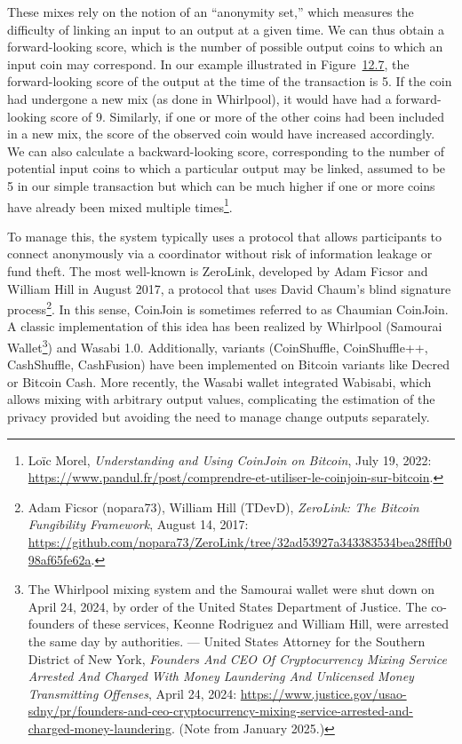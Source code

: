 \documentclass[
  a5paper,
  smalldemyvopaper,10pt,twoside,onecolumn,openright,extrafontsizes,hidelinks]{memoir}
\begin{document}
These mixes rely on the notion of an ``anonymity set,'' which measures
the difficulty of linking an input to an output at a given time. We can
thus obtain a forward-looking score, which is the number of possible
output coins to which an input coin may correspond. In our example
illustrated in Figure~\hyperref[fig:coinjoin-transaction]{12.7}, the
forward-looking score of the output at the time of the transaction is 5.
If the coin had undergone a new mix (as done in Whirlpool), it would
have had a forward-looking score of 9. Similarly, if one or more of the
other coins had been included in a new mix, the score of the observed
coin would have increased accordingly. We can also calculate a
backward-looking score, corresponding to the number of potential input
coins to which a particular output may be linked, assumed to be 5 in our
simple transaction but which can be much higher if one or more coins
have already been mixed multiple times\footnote{Loïc Morel,
  \emph{Understanding and Using CoinJoin on Bitcoin}, July 19, 2022:
  \url{https://www.pandul.fr/post/comprendre-et-utiliser-le-coinjoin-sur-bitcoin}.}.

To manage this, the system typically uses a protocol that allows
participants to connect anonymously via a coordinator without risk of
information leakage or fund theft. The most well-known is ZeroLink,
developed by Adam Ficsor and William Hill in August 2017, a protocol
that uses David Chaum's blind signature process\footnote{Adam Ficsor
  (nopara73), William Hill (TDevD), \emph{ZeroLink: The Bitcoin
  Fungibility Framework}, August 14, 2017:
  \url{https://github.com/nopara73/ZeroLink/tree/32ad53927a343383534bea28fffb098af65fe62a}.}.
In this sense, CoinJoin is sometimes referred to as Chaumian CoinJoin. A
classic implementation of this idea has been realized by Whirlpool
(Samourai Wallet\footnote{The Whirlpool mixing system and the Samourai
  wallet were shut down on April 24, 2024, by order of the United States
  Department of Justice. The co-founders of these services, Keonne
  Rodriguez and William Hill, were arrested the same day by authorities.
  --- United States Attorney for the Southern District of New York,
  \emph{Founders And CEO Of Cryptocurrency Mixing Service Arrested And
  Charged With Money Laundering And Unlicensed Money Transmitting
  Offenses}, April 24, 2024:
  \url{https://www.justice.gov/usao-sdny/pr/founders-and-ceo-cryptocurrency-mixing-service-arrested-and-charged-money-laundering}.
  (Note from January 2025.)}) and Wasabi 1.0. Additionally, variants
(CoinShuffle, CoinShuffle++, CashShuffle, CashFusion) have been
implemented on Bitcoin variants like Decred or Bitcoin Cash. More
recently, the Wasabi wallet integrated Wabisabi, which allows mixing
with arbitrary output values, complicating the estimation of the privacy
provided but avoiding the need to manage change outputs separately.
\end{document}

